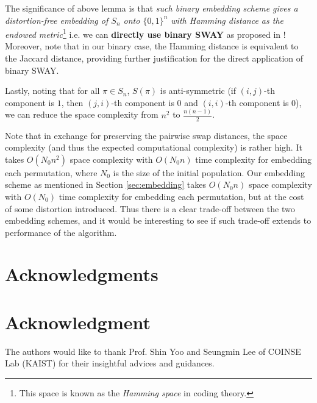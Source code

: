 \documentclass[10pt,journal,compsoc]{IEEEtran}
\begin{document}
	The significance of above lemma is that {\it such binary embedding scheme gives a distortion-free embedding of $S_n$ onto $\{0, 1\}^n$ with Hamming distance as the endowed metric}\footnote{This space is known as the {\it Hamming space} in coding theory.} i.e. we can {\bf directly use binary SWAY} as proposed in \cite{SWAY}!
	Moreover, note that in our binary case, the Hamming distance is equivalent to the Jaccard distance, providing further justification for the direct application of binary SWAY.
	
	Lastly, noting that for all $\pi \in S_n$, $S(\pi)$ is anti-symmetric (if $(i, j)$-th component is $1$, then $(j, i)$-th component is $0$ and $(i, i)$-th component is $0$), we can reduce the space complexity from $n^2$ to $\frac{n(n-1)}{2}$.
	
	Note that in exchange for preserving the pairwise swap distances, the space complexity (and thus the expected computational complexity) is rather high.
	It takes $O(N_0 n^2)$ space complexity with $O(N_0 n)$ time complexity for embedding each permutation, where $N_0$ is the size of the initial population.
	Our embedding scheme as mentioned in Section \ref{sec:embedding} takes $O(N_0 n)$ space complexity with $O(N_0)$ time complexity for embedding each permutation, but at the cost of some distortion introduced.
	Thus there is a clear trade-off between the two embedding schemes, and it would be interesting to see if such trade-off extends to performance of the algorithm.
	
	
	\ifCLASSOPTIONcompsoc
	\section*{Acknowledgments}
	\else
	\section*{Acknowledgment}
	\fi
	
	
	The authors would like to thank Prof. Shin Yoo and Seungmin Lee of COINSE Lab (KAIST) for their insightful advices and guidances.
	
	
	\ifCLASSOPTIONcaptionsoff
	\newpage
	\fi
	
	
	
	
\end{document}
